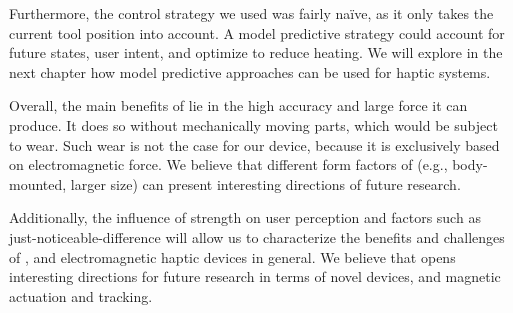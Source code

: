 Furthermore, the control strategy we used was fairly naïve, as it only takes the current tool position into account. A model predictive strategy could account for future states, user intent, and optimize to reduce heating. We will explore in the next chapter how model predictive approaches can be used for haptic systems.

Overall, the main benefits of \omniUIST lie in the high accuracy and large force it can produce. It does so without mechanically moving parts, which would be subject to wear.
Such wear is not the case for our device, because it is exclusively based on electromagnetic force. We believe that different form factors of \omniUIST (e.g., body-mounted, larger size) can present interesting directions of future research. 

Additionally, the influence of strength on user perception and factors such as just-noticeable-difference will allow us to characterize the benefits and challenges of \omniUIST, and electromagnetic haptic devices in general.
We believe that \omniUIST opens interesting directions for future research in terms of novel devices, and magnetic actuation and tracking.